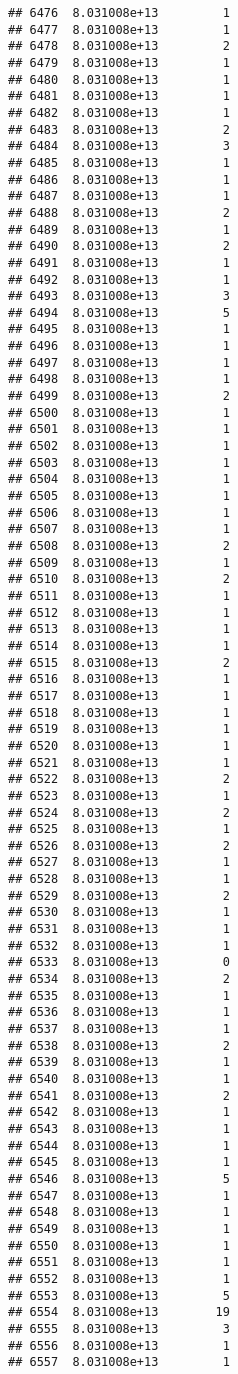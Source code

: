 \documentclass[
]{article}
\begin{document}
\begin{verbatim}
## 6476  8.031008e+13         1
## 6477  8.031008e+13         1
## 6478  8.031008e+13         2
## 6479  8.031008e+13         1
## 6480  8.031008e+13         1
## 6481  8.031008e+13         1
## 6482  8.031008e+13         1
## 6483  8.031008e+13         2
## 6484  8.031008e+13         3
## 6485  8.031008e+13         1
## 6486  8.031008e+13         1
## 6487  8.031008e+13         1
## 6488  8.031008e+13         2
## 6489  8.031008e+13         1
## 6490  8.031008e+13         2
## 6491  8.031008e+13         1
## 6492  8.031008e+13         1
## 6493  8.031008e+13         3
## 6494  8.031008e+13         5
## 6495  8.031008e+13         1
## 6496  8.031008e+13         1
## 6497  8.031008e+13         1
## 6498  8.031008e+13         1
## 6499  8.031008e+13         2
## 6500  8.031008e+13         1
## 6501  8.031008e+13         1
## 6502  8.031008e+13         1
## 6503  8.031008e+13         1
## 6504  8.031008e+13         1
## 6505  8.031008e+13         1
## 6506  8.031008e+13         1
## 6507  8.031008e+13         1
## 6508  8.031008e+13         2
## 6509  8.031008e+13         1
## 6510  8.031008e+13         2
## 6511  8.031008e+13         1
## 6512  8.031008e+13         1
## 6513  8.031008e+13         1
## 6514  8.031008e+13         1
## 6515  8.031008e+13         2
## 6516  8.031008e+13         1
## 6517  8.031008e+13         1
## 6518  8.031008e+13         1
## 6519  8.031008e+13         1
## 6520  8.031008e+13         1
## 6521  8.031008e+13         1
## 6522  8.031008e+13         2
## 6523  8.031008e+13         1
## 6524  8.031008e+13         2
## 6525  8.031008e+13         1
## 6526  8.031008e+13         2
## 6527  8.031008e+13         1
## 6528  8.031008e+13         1
## 6529  8.031008e+13         2
## 6530  8.031008e+13         1
## 6531  8.031008e+13         1
## 6532  8.031008e+13         1
## 6533  8.031008e+13         0
## 6534  8.031008e+13         2
## 6535  8.031008e+13         1
## 6536  8.031008e+13         1
## 6537  8.031008e+13         1
## 6538  8.031008e+13         2
## 6539  8.031008e+13         1
## 6540  8.031008e+13         1
## 6541  8.031008e+13         2
## 6542  8.031008e+13         1
## 6543  8.031008e+13         1
## 6544  8.031008e+13         1
## 6545  8.031008e+13         1
## 6546  8.031008e+13         5
## 6547  8.031008e+13         1
## 6548  8.031008e+13         1
## 6549  8.031008e+13         1
## 6550  8.031008e+13         1
## 6551  8.031008e+13         1
## 6552  8.031008e+13         1
## 6553  8.031008e+13         5
## 6554  8.031008e+13        19
## 6555  8.031008e+13         3
## 6556  8.031008e+13         1
## 6557  8.031008e+13         1

\end{verbatim}
\end{document}
